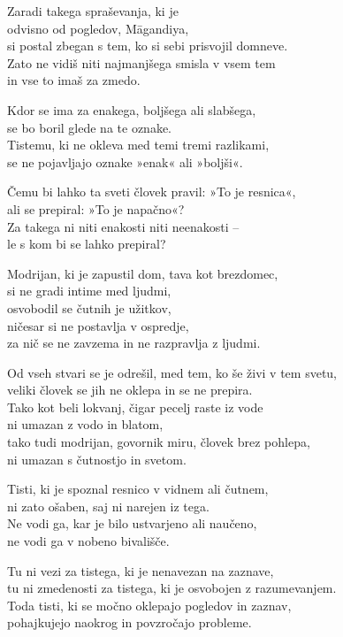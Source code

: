 Zaradi takega spraševanja, ki je\\\vin odvisno od pogledov, Māgandiya,\\
si postal zbegan s tem, ko si sebi prisvojil domneve.\\
Zato ne vidiš niti najmanjšega smisla v vsem tem\\
in vse to imaš za zmedo.

\clearpage

Kdor se ima za enakega, boljšega ali slabšega,\\
se bo boril glede na te oznake.\\
Tistemu, ki ne okleva med temi tremi razlikami,\\
se ne pojavljajo oznake »enak« ali »boljši«.

Čemu bi lahko ta sveti človek pravil: »To je resnica«,\\
ali se prepiral: »To je napačno«?\\
Za takega ni niti enakosti niti neenakosti --\\
le s kom bi se lahko prepiral?

Modrijan, ki je zapustil dom, tava kot brezdomec,\\
si ne gradi intime med ljudmi,\\
osvobodil se čutnih je užitkov,\\\vin ničesar si ne postavlja v ospredje,\\
za nič se ne zavzema in ne razpravlja z ljudmi.

Od vseh stvari se je odrešil, med tem, ko še živi v tem svetu,\\
veliki človek se jih ne oklepa in se ne prepira.\\
Tako kot beli lokvanj, čigar pecelj raste iz vode\\
ni umazan z vodo in blatom,\\
tako tudi modrijan, govornik miru, človek brez pohlepa,\\
ni umazan s čutnostjo in svetom.

\clearpage

Tisti, ki je spoznal resnico v vidnem ali čutnem,\\
ni zato ošaben, saj ni narejen iz tega.\\
Ne vodi ga, kar je bilo ustvarjeno ali naučeno,\\
ne vodi ga v nobeno bivališče.

Tu ni vezi za tistega, ki je nenavezan na zaznave,\\
tu ni zmedenosti za tistega, ki je osvobojen z razumevanjem.\\
Toda tisti, ki se močno oklepajo pogledov in zaznav,\\
pohajkujejo naokrog in povzročajo probleme.

